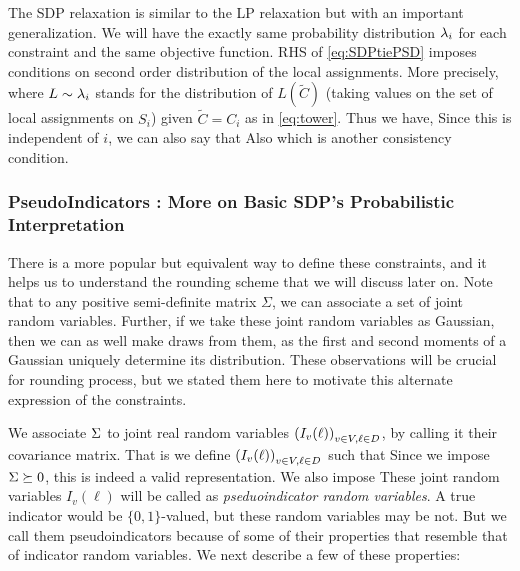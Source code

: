 The SDP relaxation is similar to the LP relaxation but with an important generalization. 
We will have the exactly same probability distribution $\lambda_{i}$ for each constraint and the same objective function. 
RHS of \ref{eq:SDPtiePSD} imposes conditions on second order distribution of the local assignments. 
More precisely,
 where $L \sim\lambda_i$ stands for the distribution of $L(\tilde{C})$ (taking values on the set of local assignments on $S_i$) given $\tilde{C} = C_i$ as in \ref{eq:tower}.
Thus we have, 
Since this is independent of $i$, we can also say that 
Also 
which is another consistency condition.


\subsubsection{PseudoIndicators : More on Basic SDP's Probabilistic Interpretation}
There is a more popular but equivalent way to define these constraints, and it helps us to understand the rounding scheme that we will discuss later on. 
Note that to any positive semi-definite matrix $\Sigma$, we can associate a set of joint random variables. 
Further, if we take these joint random variables as Gaussian, then we can as well make draws from them, as the first and second moments of a Gaussian  uniquely determine its distribution. 
These observations will be crucial for rounding process, but we stated them here to motivate this alternate expression of the constraints. 

We associate $\Sigma$ to joint real random variables $\left(I_v(\ell)\right)_{v\in V, \ell \in D}$, by calling it their covariance matrix. That is we define $\left(I_v(\ell)\right)_{v\in V, \ell \in D}$ such that
Since we impose $\Sigma \succeq 0$, this is indeed a valid representation. We also impose
These joint random variables $I_v(\ell)$ will be called as \textit{pseduoindicator random variables}. A true indicator would be $\{ 0, 1\}$-valued, but these random variables may be not. But we call them pseudoindicators because of some of their properties that resemble that of indicator random variables. We next describe a few of these properties: 


